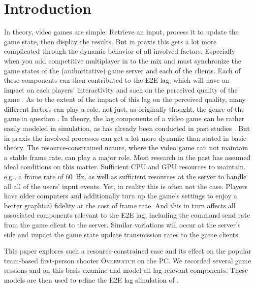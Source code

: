 
\section{Introduction}

In theory, video games are simple: Retrieve an input, process it to update the game state, then display the results. But in praxis this gets a lot more complicated through the dynamic behavior of all involved factors. Especially when you add competitive multiplayer in to the mix and must synchronize the game states of the (authoritative) game server and each of the clients. Each of these components can then contributed to the \gls{E2E} lag, which will have an impact on each players' interactivity and such on the perceived quality of the game \cite{Claypool:2006:LPA:1167838.1167860,7965676}. As to the extent of the impact of this lag on the perceived quality, many different factors can play a role, not just, as originally thought, the genre of the game in question \cite{mollertowards}. In theory, the lag components of a video game can be rather easily modeled in simulation, as has already been conducted in past studies \cite{Metzger+2016}. But in praxis the involved processes can get a lot more dynamic than stated in basic theory. The resource-constrained nature, where the video game can not maintain a stable frame rate, can play a major role. Most research in the past has assumed ideal conditions on this matter. Sufficient CPU and GPU resources to maintain, e.g., a frame rate of \SI{60}{\hertz}, as well as sufficient resources at the server to handle all all of the users' input events. Yet, in reality this is often not the case. Players have older computers and additionally turn up the game's settings to enjoy a better graphical fidelity at the cost of frame rate. And this in turn affects all associated components relevant to the \gls{E2E} lag, including the command send rate from the game client to the server. Similar variations will occur at the server's side and impact the game state update transmission rates to the game clients.

This paper explores such a resource-constrained case and its effect on the popular team-based first-person shooter \textsc{Overwatch} on the PC. We recorded several game sessions and on this basis examine and model all lag-relevant components. These models are then used to refine the \gls{E2E} lag simulation of \cite{Metzger+2016}.